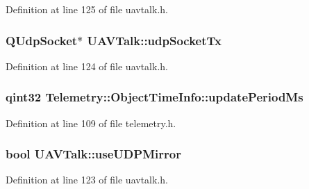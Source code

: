 Definition at line 125 of file uavtalk.\-h.

\hypertarget{group___u_a_v_talk_plugin_ga02f40e7ac97a6778928a5e9869ea5bc8}{
\subsubsection[{udp\-Socket\-Tx}]{\setlength{\rightskip}{0pt plus 5cm}Q\-Udp\-Socket$\ast$ U\-A\-V\-Talk\-::udp\-Socket\-Tx\hspace{0.3cm}{\ttfamily [protected]}}}\label{group___u_a_v_talk_plugin_ga02f40e7ac97a6778928a5e9869ea5bc8}


Definition at line 124 of file uavtalk.\-h.

\hypertarget{group___u_a_v_talk_plugin_ga63538585df200e147d34a4a929976b4d}{
\subsubsection[{update\-Period\-Ms}]{\setlength{\rightskip}{0pt plus 5cm}qint32 Telemetry\-::\-Object\-Time\-Info\-::update\-Period\-Ms}}\label{group___u_a_v_talk_plugin_ga63538585df200e147d34a4a929976b4d}


Definition at line 109 of file telemetry.\-h.

\hypertarget{group___u_a_v_talk_plugin_ga5198259bc34e6f215c111d731b822e3f}{
\subsubsection[{use\-U\-D\-P\-Mirror}]{\setlength{\rightskip}{0pt plus 5cm}bool U\-A\-V\-Talk\-::use\-U\-D\-P\-Mirror\hspace{0.3cm}{\ttfamily [protected]}}}\label{group___u_a_v_talk_plugin_ga5198259bc34e6f215c111d731b822e3f}


Definition at line 123 of file uavtalk.\-h.



